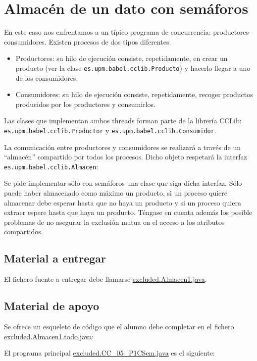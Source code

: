 \documentclass{article}
\begin{document}
\section{Almacén de un dato con semáforos}
En este caso nos enfrentamos a un típico programa de concurrencia:
productores-consumidores. Existen procesos de dos tipos diferentes:
\begin{itemize}
\item Productores: su hilo de ejecución consiste, repetidamente, en
  crear un producto (ver la clase \lstinline{es.upm.babel.cclib.Producto}) y
  hacerlo llegar a uno de los consumidores.
\item Consumidores: su hilo de ejecución consiste, repetidamente,
  recoger productos producidos por los productores y consumirlos.
\end{itemize}
Las clases que implementan ambos threads forman parte de la librería
CCLib:
\newline
\lstinline{es.upm.babel.cclib.Productor} y
\lstinline{es.upm.babel.cclib.Consumidor}.

La comunicación entre productores y consumidores se realizará a través
de un ``almacén'' compartido por todos los procesos. Dicho objeto
respetará la interfaz \lstinline{es.upm.babel.cclib.Almacen}:


Se pide implementar sólo con semáforos una clase que siga dicha
interfaz. Sólo puede haber almacenado como máximo un producto, si un
proceso quiere almacenar debe esperar hasta que no haya un producto y
si un proceso quiera extraer espere hasta que haya un
producto. Téngase en cuenta además los posible problemas de no
asegurar la exclusión mutua en el acceso a los atributos
compartidos.

\subsection*{Material a entregar}
El fichero fuente a entregar debe llamarse \url{excluded.Almacen1.java}.

\subsection*{Material de apoyo}
Se ofrece un esqueleto de código que el alumno debe completar en el fichero
\url{excluded.Almacen1.todo.java}:


El programa principal \url{excluded.CC_05_P1CSem.java} es el siguiente:

\end{document}
